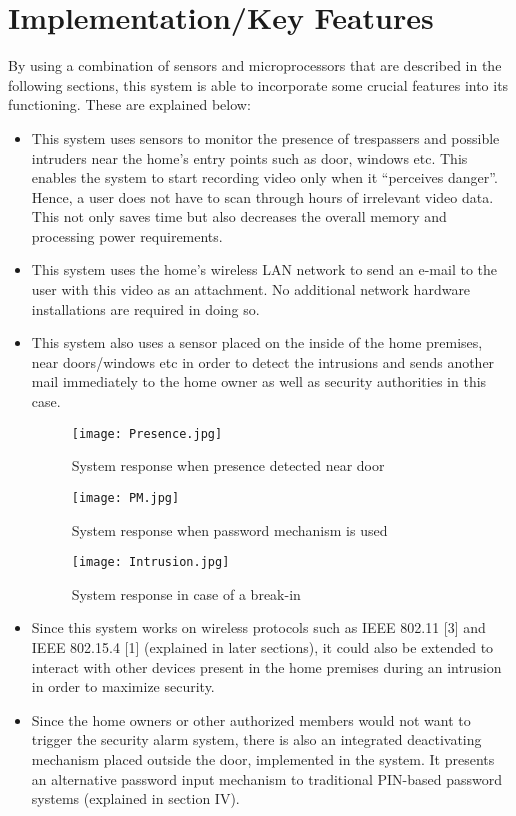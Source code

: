 \documentclass[letterpaper, 10 pt, conference]{ieeeconf}
\begin{document}
\section{Implementation/Key Features}

By using a combination of sensors and microprocessors that are described in the following sections, this system is able to incorporate some crucial features into its functioning. These are explained below:
\begin{itemize}
\item This system uses sensors to monitor the presence of trespassers and possible intruders near the home’s entry points such as door, windows etc. This enables the system to start recording video only when it “perceives danger”. Hence, a user does not have to scan through hours of irrelevant video data. This not only saves time but also decreases the overall memory and processing power requirements.

\item This system uses the home’s wireless LAN network to send an e-mail to the user with this video as an attachment. No additional network hardware installations are required in doing so.

\item This system also uses a sensor placed on the inside of the home premises, near doors/windows etc in order to detect the intrusions and sends another mail immediately to the home owner as well as security authorities in this case.

\begin{figure}[h!]
\centering
\texttt{[image: Presence.jpg]}
\caption{\label{fig:Presence}System response when presence detected near door}
\end{figure}

\begin{figure}[h!]
\centering
	\texttt{[image: PM.jpg]}
\caption{\label{fig:PM}System response when password mechanism is used}
\end{figure}

\begin{figure}[h!]
\centering
\texttt{[image: Intrusion.jpg]}
\caption{\label{fig:Intrusion}System response in case of a break-in}
\end{figure}


\item  Since this system works on wireless protocols such as IEEE 802.11 [3] and IEEE 802.15.4 [1] (explained in later sections), it could also be extended to interact with other devices present in the home premises during an intrusion in order to maximize security.

\item  Since the home owners or other authorized members would not want to trigger the security alarm system, there is also an integrated deactivating mechanism placed outside the door, implemented in the system. It presents an alternative password input mechanism to traditional PIN-based password systems (explained in section IV).

\end{itemize}
\end{document}
